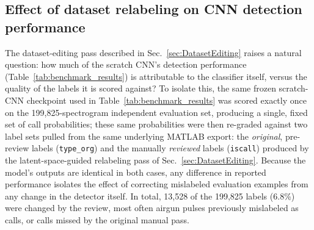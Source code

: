 \documentclass[preprint,NumberedRefs]{JASAnew}
\begin{document}
\subsection{Effect of dataset relabeling on CNN detection performance}
\label{sec:CNNRelabel}

The dataset-editing pass described in Sec.~\ref{sec:DatasetEditing} raises a
natural question: how much of the scratch CNN's detection performance
(Table~\ref{tab:benchmark_results}) is attributable to the classifier itself,
versus the quality of the labels it is scored against? To isolate this, the
same frozen scratch-CNN checkpoint used in Table~\ref{tab:benchmark_results}
was scored exactly once on the 199,825-spectrogram independent evaluation
set, producing a single, fixed set of call probabilities; these same
probabilities were then re-graded against two label sets pulled from the
same underlying MATLAB export: the \emph{original}, pre-review labels
(\texttt{type\_org}) and the manually \emph{reviewed} labels (\texttt{iscall})
produced by the latent-space-guided relabeling pass of
Sec.~\ref{sec:DatasetEditing}. Because the model's outputs are identical in
both cases, any difference in reported performance isolates the effect of
correcting mislabeled evaluation examples from any change in the detector
itself. In total, 13,528 of the 199,825 labels (6.8\%) were changed by the
review, most often airgun pulses previously mislabeled as calls, or calls
missed by the original manual pass.

\end{document}
